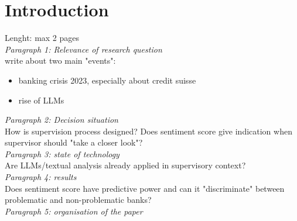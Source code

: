 \chapter{Introduction}\label{sec1}
\thispagestyle{empty}

Lenght: max 2 pages \\

\noindent
\textit{Paragraph 1: Relevance of research question} \\
\noindent
write about two main "events":

\begin{itemize}
	\item banking crisis 2023, especially about credit suisse
	\item rise of LLMs 
\end{itemize}

\noindent
\textit{Paragraph 2: Decision situation} \\
\noindent
How is supervision process designed? Does sentiment score give indication when supervisor should "take a closer look"? \\

\noindent
\textit{Paragraph 3: state of technology} \\
\noindent
Are LLMs/textual analysis already applied in supervisory context? \\

\noindent
\textit{Paragraph 4: results} \\
Does sentiment score have predictive power and can it "discriminate" between problematic and non-problematic banks? \\

\noindent
\textit{Paragraph 5: organisation of the paper}



\cleardoublepage
